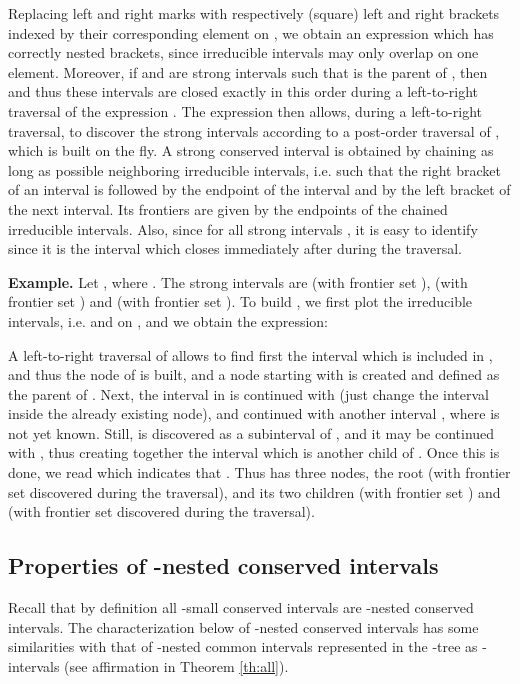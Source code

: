 \documentclass{article}
\begin{document}
\begin{preuve}
Replacing left and right marks with respectively (square) left and right brackets indexed by their corresponding 
element  on , we obtain an expression  which has correctly nested brackets, 
since irreducible intervals may only overlap on one element. Moreover,  if  and  are strong 
intervals such that  is the parent of , then  and thus these
intervals are closed exactly in this order during a left-to-right traversal of the expression .
The expression  then allows, during a left-to-right traversal, to discover the strong intervals 
according to a post-order traversal of , which is built on the fly. A strong conserved interval 
is obtained by chaining as long as possible neighboring irreducible intervals, i.e. such that the
right bracket of an interval is followed by the endpoint   of the interval and by the left bracket 
of the next interval. Its frontiers  are given by the endpoints of the chained irreducible intervals. 
Also, since  for all strong intervals , it is easy to identify  since it is 
the interval which closes immediately after  during the traversal. 
\end{preuve}

{\bf Example.} Let , where . The strong intervals
are  (with frontier set ),  (with frontier set ) and
 (with frontier set ). To build , we first plot the irreducible intervals, i.e.
 and   on , and we obtain the expression:


\noindent A left-to-right traversal of  allows to find first the interval  which is included in ,
and thus the node  of  is built, and a node  starting with  is created and defined as the parent
of . Next, the interval  in  is continued with  (just change the interval inside
the already existing node), and continued with another interval , where  is not yet known.
Still,   is discovered as a subinterval of , and it may be continued with ,
thus creating together the interval  which is another child of . Once this is done, we read
 which indicates that . Thus  has three nodes, the root  (with frontier set 
discovered during the traversal), and its two children  (with frontier set ) and 
 (with frontier set  discovered during the traversal).

\subsection{Properties of -nested conserved intervals}
\label{sect:conservedproperties}

Recall that by definition all -small conserved
intervals are -nested conserved intervals. The
characterization below of -nested conserved intervals has some
similarities with that of -nested common intervals represented in
the -tree as -intervals (see affirmation  in Theorem
\ref{th:all}).
\end{document}
